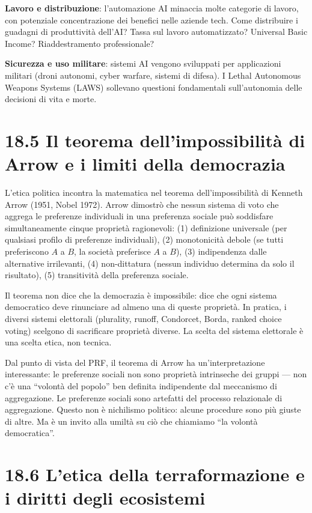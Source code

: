 \documentclass[11.5pt,a4paper,openany]{book}
\theoremstyle{remark}
\begin{document}
\textbf{Lavoro e distribuzione}: l'automazione AI minaccia molte categorie di lavoro, con potenziale concentrazione dei benefici nelle aziende tech. Come distribuire i guadagni di produttività dell'AI? Tassa sul lavoro automatizzato? Universal Basic Income? Riaddestramento professionale?

\textbf{Sicurezza e uso militare}: sistemi AI vengono sviluppati per applicazioni militari (droni autonomi, cyber warfare, sistemi di difesa). I Lethal Autonomous Weapons Systems (LAWS) sollevano questioni fondamentali sull'autonomia delle decisioni di vita e morte.

\section{18.5 Il teorema dell'impossibilità di Arrow e i limiti della democrazia}

L'etica politica incontra la matematica nel teorema dell'impossibilità di Kenneth Arrow (1951, Nobel 1972). Arrow dimostrò che nessun sistema di voto che aggrega le preferenze individuali in una preferenza sociale può soddisfare simultaneamente cinque proprietà ragionevoli: (1) definizione universale (per qualsiasi profilo di preferenze individuali), (2) monotonicità debole (se tutti preferiscono $A$ a $B$, la società preferisce $A$ a $B$), (3) indipendenza dalle alternative irrilevanti, (4) non-dittatura (nessun individuo determina da solo il risultato), (5) transitività della preferenza sociale.

Il teorema non dice che la democrazia è impossibile: dice che ogni sistema democratico deve rinunciare ad almeno una di queste proprietà. In pratica, i diversi sistemi elettorali (plurality, runoff, Condorcet, Borda, ranked choice voting) scelgono di sacrificare proprietà diverse. La scelta del sistema elettorale è una scelta etica, non tecnica.

Dal punto di vista del PRF, il teorema di Arrow ha un'interpretazione interessante: le preferenze sociali non sono proprietà intrinseche dei gruppi --- non c'è una ``volontà del popolo'' ben definita indipendente dal meccanismo di aggregazione. Le preferenze sociali sono artefatti del processo relazionale di aggregazione. Questo non è nichilismo politico: alcune procedure sono più giuste di altre. Ma è un invito alla umiltà su ciò che chiamiamo ``la volontà democratica''.

\section{18.6 L'etica della terraformazione e i diritti degli ecosistemi}
\end{document}
